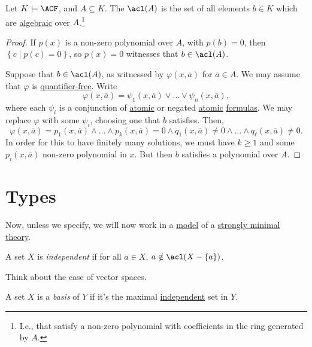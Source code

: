 \begin{theorem}
	Let \(K \models \ACF\), and \(A \subseteq K\). The \(\acl(A)\)  is the set of all elements \(b\in K\) which are \hyperref[def:algebraic]{algebraic} over \(A\).\footnote{I.e., that satisfy a non-zero polynomial with coefficients in the ring generated by \(A\).}
\end{theorem}
\begin{proof}
	If \(p(x)\) is a non-zero polynomial over \(A\), with \(p(b) = 0\), then \(\left\{ c \mid p(c) = 0 \right\} \), so \(p(x) = 0\) witnesses that \(b\in \acl(A)\).

	Suppose that \(b\in \acl(A)\), as witnessed by \(\varphi (x, \overline{a} )\) for \(\overline{a} \in A\). We may assume that \(\varphi \) is \hyperref[not:quantifier-free]{quantifier-free}. Write
	\[
		\varphi (x, \overline{a} ) = \psi _1(x, \overline{a} ) \lor \ldots \lor \psi _n(x, \overline{a} ),
	\]
	where each \(\psi _i\) is a conjunction of \hyperref[not:atomic]{atomic} or negated \hyperref[not:atomic]{atomic} \hyperref[def:formula]{formulas}. We may replace \(\varphi \) with some \(\psi _i\), choosing one that \(b\) satisfies. Then,
	\[
		\varphi (x, \overline{a} ) = p_1(x, \overline{a} ) \land \ldots \land p_k(x, \overline{a} ) = 0 \land q_1(x, \overline{a} ) \neq 0 \land \ldots \land q_{\ell}(x, \overline{a} ) \neq 0.
	\]
	In order for this to have finitely many solutions, we must have \(k \geq 1\) and some \(p_i(x, \overline{a} )\) non-zero polynomial in \(x\). But then \(b\) satisfies a polynomial over \(A\).
\end{proof}

\section{Types}
Now, unless we specify, we will now work in a \hyperref[def:model]{model} of a \hyperref[def:strongly-minimal]{strongly minimal} \hyperref[def:theory]{theory}.

\begin{definition}[Independent]\label{def:independent}
	A set \(X\) is \emph{independent} if for all \(a\in X\), \(a \notin \acl(X - \left\{ a \right\} )\).
\end{definition}

\begin{intuition}
	Think about the case of vector spaces.
\end{intuition}

\begin{definition}[Basis]\label{def:basis}
	A set \(X\) is a \emph{basis} of \(Y\) if it's the maximal \hyperref[def:independent]{independent} set in \(Y\).
\end{definition}

